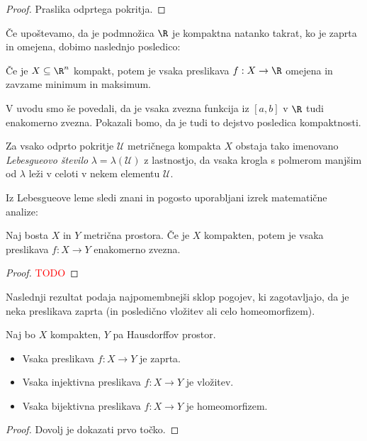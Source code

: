 \begin{proof}
    Praslika odprtega pokritja.
\end{proof}
Če upoštevamo, da je podmnožica \(\R\) je kompaktna natanko takrat, ko je zaprta in omejena, dobimo naslednjo posledico:
\begin{posledica}
    Če je $X \subseteq \R^n$ kompakt, potem je vsaka preslikava $f: X \to \R$ omejena in zavzame minimum in maksimum.
\end{posledica}

V uvodu smo še povedali, da je vsaka zvezna funkcija iz $[a,b]$ v \(\R\) tudi enakomerno zvezna. Pokazali bomo, da je tudi to dejstvo posledica kompaktnosti.

\begin{izrek}
    Za vsako odprto pokritje \(\mathcal{U}\) metričnega kompakta $X$ obstaja tako imenovano \emph{Lebesgueovo število} $\lambda = \lambda (\mathcal{U})$ z lastnostjo, da vsaka krogla s polmerom manjšim od $\lambda$ leži v celoti v nekem elementu $\mathcal{U}$.
\end{izrek}

Iz Lebesgueove leme sledi znani in pogosto uporabljani izrek matematične analize:
\begin{izrek}
    Naj bosta $X$ in $Y$ metrična prostora. Če je $X$ kompakten, potem je vsaka preslikava $f: X \to Y$ enakomerno zvezna.
\end{izrek}

\begin{proof}
    \textcolor{red}{TODO}
\end{proof}

Naslednji rezultat podaja najpomembnejši sklop pogojev, ki zagotavljajo, da je neka preslikava zaprta (in posledično vložitev ali celo homeomorfizem).

\begin{izrek}
    Naj bo $X$ kompakten, $Y$ pa Hausdorffov prostor.
    \begin{itemize}
        \item Vsaka preslikava $f: X \to Y$ je zaprta.
        \item Vsaka injektivna preslikava \(f:  X \to Y\) je vložitev.
        \item Vsaka bijektivna preslikava \(f:  X \to Y\) je homeomorfizem.
    \end{itemize}
\end{izrek}

\begin{proof}
    Dovolj je dokazati prvo točko.
\end{proof}

